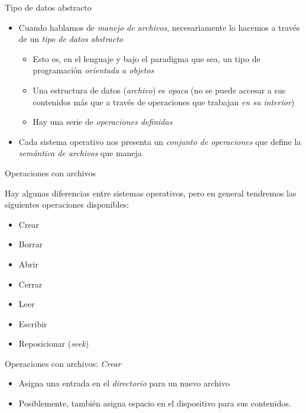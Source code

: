 \documentclass[presentation]{beamer}
\begin{document}
\begin{frame}[label={sec:org298d7ea}]{Tipo de datos abstracto}
\begin{itemize}
\item Cuando hablamos de \emph{manejo de archivos}, necesariamente lo hacemos
a través de un \emph{tipo de datos abstracto}
\begin{itemize}
\item Esto es, en el lenguaje y bajo el paradigma que sea, un tipo de
programación \emph{orientada a objetos}
\item Una estructura de datos (\emph{archivo}) es \emph{opaca} (no se puede
accesar a sus contenidos más que a través de operaciones que
trabajan \emph{en su interior})
\item Hay una serie de \emph{operaciones definidas}
\end{itemize}
\item Cada sistema operativo nos presenta un \emph{conjunto de operaciones}
que define la \emph{semántica de archivos} que maneja
\end{itemize}
\end{frame}

\begin{frame}[label={sec:org44b40dd}]{Operaciones con archivos}
\begin{center}
Hay algunas diferencias entre sistemas operativos, pero en general
tendremos las siguientes operaciones disponibles:
\end{center}
\begin{itemize}
\item Crear
\item Borrar
\item Abrir
\item Cerrar
\item Leer
\item Escribir
\item Reposicionar (\emph{seek})
\end{itemize}
\end{frame}

\begin{frame}[label={sec:org93d668d}]{Operaciones con archivos: \emph{Crear}}
\begin{itemize}
\item Asigna una entrada en el \emph{directorio} para un nuevo archivo
\item Posiblemente, también asigna espacio en el dispositivo para sus contenidos.
\end{itemize}
\end{frame}
\end{document}
